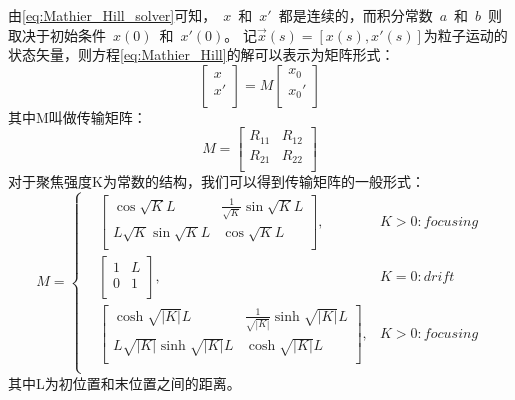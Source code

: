 由\ref{eq:Mathier_Hill_solver}可知，~$x$~和~$x'$~都是连续的，而积分常数~$a$~和~$b$~则取决于初始条件~$x(0)$~和~$x'(0)$。
记$\vec{x}(s)=[x(s),x'(s)]$为粒子运动的状态矢量，则方程\ref{eq:Mathier_Hill}的解可以表示为矩阵形式：
\begin{equation}
    \label{eq:Mathier_Hill_solver_matrix}
    \begin{bmatrix}
      x   \\
      x'  \\
    \end{bmatrix}
    =
    M
    \begin{bmatrix}
      x_0   \\
      x_0'  \\
    \end{bmatrix}
\end{equation}
其中M叫做传输矩阵：
\begin{equation}
    \label{eq:Mathier_Hill_tranfermap}
    M=
    \begin{bmatrix}
      R_{11} & R_{12}  \\
      R_{21} & R_{22}  \\
    \end{bmatrix}
\end{equation}
对于聚焦强度K为常数的结构，我们可以得到传输矩阵的一般形式：
\begin{equation}
    \label{eq:Mathier_Hill_tranfermap_K}
    M=\left\{
    \begin{aligned}
        &\begin{bmatrix}
          \cos \sqrt{K}L                & \frac{1}{\sqrt{K}} \sin \sqrt{K}L  \\
          L{\sqrt{K}} \sin \sqrt{K}L    & \cos \sqrt{K}L   \\
        \end{bmatrix}
        ,& K>0:focusing  \\
        &\begin{bmatrix}
          1 & L  \\
          0 & 1  \\
        \end{bmatrix}
        ,& K=0:drift  \\
        &\begin{bmatrix}
          \cosh \sqrt{|K|}L                & \frac{1}{\sqrt{|K|}} \sinh \sqrt{|K|}L  \\
          L{\sqrt{|K|}} \sinh \sqrt{|K|}L    & \cosh \sqrt{|K|}L   \\
        \end{bmatrix}
        ,& K>0:focusing  \\
    \end{aligned}
    \right.
\end{equation}
其中L为初位置和末位置之间的距离。

